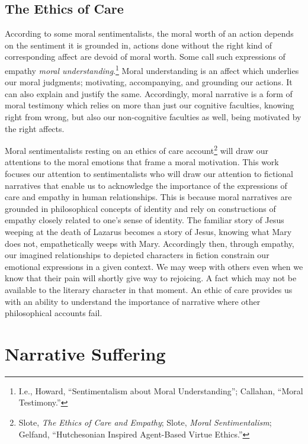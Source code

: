 \documentclass[phdthesis,12pt,final]{wuthesis}
\theoremstyle{definition}
\theoremstyle{definition}
\theoremstyle{definition}
\theoremstyle{definition}
\theoremstyle{remark}
\begin{document}
\subsection*{The Ethics of Care}\label{the-ethics-of-care}

According to some moral sentimentalists, the moral worth of an action depends on the sentiment it is grounded in, actions done without the right kind of corresponding affect are devoid of moral worth. Some call such expressions of empathy \emph{moral understanding}.\footnote{I.e., Howard, {``Sentimentalism about {Moral Understanding}''}; Callahan, {``Moral {Testimony}.''}} Moral understanding is an affect which underlies our moral judgments; motivating, accompanying, and grounding our actions. It can also explain and justify the same. Accordingly, moral narrative is a form of moral testimony which relies on more than just our cognitive faculties, knowing right from wrong, but also our non-cognitive faculties as well, being motivated by the right affects.

Moral sentimentalists resting on an ethics of care account\footnote{Slote, \emph{The {Ethics} of {Care} and {Empathy}}; Slote, \emph{Moral {Sentimentalism}}; Gelfand, {``Hutchesonian Inspired Agent-Based Virtue Ethics.''}} will draw our attentions to the moral emotions that frame a moral motivation. This work focuses our attention to sentimentalists who will draw our attention to fictional narratives that enable us to acknowledge the importance of the expressions of care and empathy in human relationships. This is because moral narratives are grounded in philosophical concepts of identity and rely on constructions of empathy closely related to one's sense of identity. The familiar story of Jesus weeping at the death of Lazarus becomes a story of Jesus, knowing what Mary does not, empathetically weeps with Mary. Accordingly then, through empathy, our imagined relationships to depicted characters in fiction constrain our emotional expressions in a given context. We may weep with others even when we know that their pain will shortly give way to rejoicing. A fact which may not be available to the literary character in that moment. An ethic of care provides us with an ability to understand the importance of narrative where other philosophical accounts fail.

\section{Narrative Suffering}\label{narrative-suffering}
\end{document}
